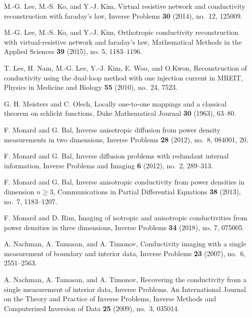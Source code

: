 \documentclass[11pt]{amsart}
\theoremstyle{plain}
\theoremstyle{remark}
\numberwithin{equation}{section}
\numberwithin{Thm}{section}
\begin{document}
\begin{thebibliography}{10}
M.-G. Lee, M.-S. Ko, and Y.-J. Kim, {Virtual resistive network and
  conductivity reconstruction with faraday's law}, Inverse Problems
  \textbf{30} (2014), no.~12, 125009.

M.-G. Lee, M.-S. Ko, and Y.-J. Kim, {Orthotropic conductivity reconstruction with virtual-resistive
  network and faraday's law}, Mathematical Methods in the Applied Sciences \textbf{39}
  (2015), no. 5, 1183--1196.%

T. Lee, H. Nam, M.-G. Lee, Y.-J. Kim, E. Woo, and O.Kwon, {Reconstruction of conductivity using the dual-loop method with one injection current in {MREIT}}, Physics in Medicine and Biology
  \textbf{55} (2010), no.~24, 7523.

G. H. Meisters and C. Olech, {Locally one-to-one mappings and a classical
  theorem on schlicht functions}, Duke Mathematical Journal \textbf{30} (1963),
  63--80.

  
F. Monard and G. Bal, {Inverse anisotropic diffusion from
  power density measurements in two dimensions}, Inverse Problems \textbf{28}
  (2012), no.~8, 084001, 20.

F. Monard and G. Bal, {Inverse diffusion problems with
  redundant internal information}, Inverse Problems and Imaging \textbf{6}
  (2012), no.~2, 289--313.

F. Monard and G. Bal, {Inverse anisotropic conductivity from
  power densities in dimension $n \ge 3$}, Communications in Partial
  Differential Equations \textbf{38} (2013), no.~7, 1183--1207.

        {F. Monard and D. Rim},
        {Imaging of isotropic and anisotropic conductivities from power densities in three dimensions},
        Inverse Problems \textbf{34} (2018), no. 7,  075005.
  
A. Nachman, A. Tamasan, and A. Timonov, {Conductivity
  imaging with a single measurement of boundary and interior data}, Inverse
  Problems \textbf{23} (2007), no.~6, 2551--2563.

A. Nachman, A. Tamasan, and A. Timonov, {Recovering the conductivity from a single measurement of
  interior data}, Inverse Problems. An International Journal on the Theory and
  Practice of Inverse Problems, Inverse Methods and Computerized Inversion of
  Data \textbf{25} (2009), no.~3, 035014. 


\end{thebibliography}
\end{document}
